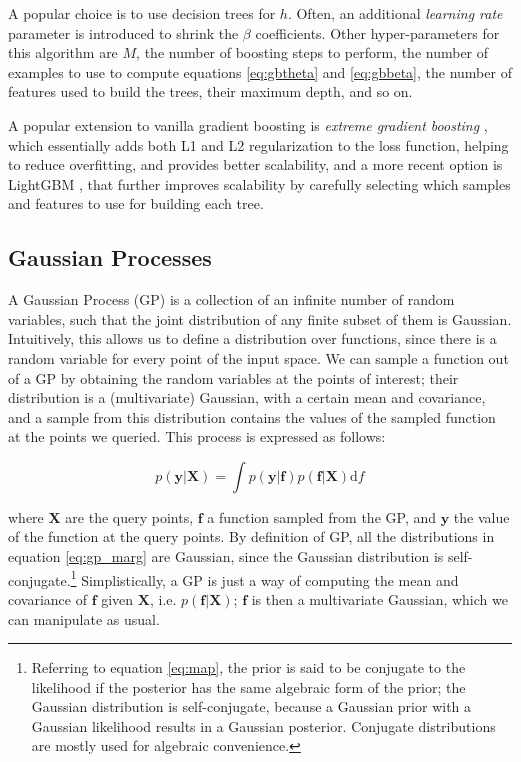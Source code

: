 \documentclass[a4paper,11pt]{kth-mag}
\begin{document}
A popular choice is to use decision trees for $h$. Often, an additional \emph{learning rate} parameter is introduced to shrink the $\beta$ coefficients. Other hyper-parameters for this algorithm are $M$, the number of boosting steps to perform, the number of examples to use to compute equations \ref{eq:gbtheta} and \ref{eq:gbbeta}, the number of features used to build the trees, their maximum depth, and so on.

A popular extension to vanilla gradient boosting is \emph{extreme gradient boosting} \citep{xgboost}, which essentially adds both L1 and L2 regularization to the loss function, helping to reduce overfitting, and provides better scalability, and a more recent option is LightGBM \citep{lightgbm}, that further improves scalability by carefully selecting which samples and features to use for building each tree.

\subsection{Gaussian Processes}
\label{sec:gp}
A Gaussian Process (GP) is a collection of an infinite number of random variables, such that the joint distribution of any finite subset of them is Gaussian. Intuitively, this allows us to define a distribution over functions, since there is a random variable for every point of the input space. We can sample a function out of a GP by obtaining the random variables at the points of interest; their distribution is a (multivariate) Gaussian, with a certain mean and covariance, and a sample from this distribution contains the values of the sampled function at the points we queried. This process is expressed as follows:

\begin{equation}
\label{eq:gp_marg}
p(\bm y\vert\bm X)=\int p(\bm y\vert \bm f)p(\bm f\vert\bm X)\text{d}f
\end{equation}

\noindent where $\bm X$ are the query points, $\bm f$ a function sampled from the GP, and $\bm y$ the value of the function at the query points. By definition of GP, all the distributions in equation \ref{eq:gp_marg} are Gaussian, since the Gaussian distribution is self-conjugate.\footnote{Referring to equation \ref{eq:map}, the prior is said to be conjugate to the likelihood if the posterior has the same algebraic form of the prior; the Gaussian distribution is self-conjugate, because a Gaussian prior with a Gaussian likelihood results in a Gaussian posterior. Conjugate distributions are mostly used for algebraic convenience.} Simplistically, a GP is just a way of computing the mean and covariance of $\bm f$ given $\bm X$, i.e. $p(\bm f\vert\bm X)$; $\bm f$ is then a multivariate Gaussian, which we can manipulate as usual.
\end{document}
